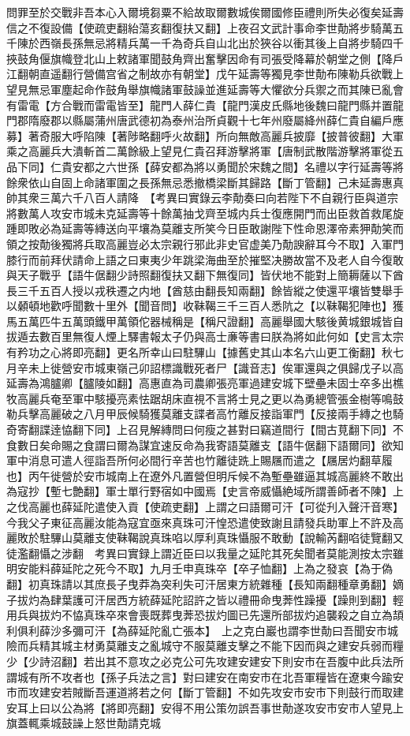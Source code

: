 問罪至於交戰非吾本心入爾境芻粟不給故取爾數城俟爾國修臣禮則所失必復矣延壽信之不復設備【使疏吏翻紿蕩亥翻復扶又翻】上夜召文武計事命李世勣將步騎萬五千陳於西嶺長孫無忌將精兵萬一千為奇兵自山北出於狹谷以衝其後上自將步騎四千挾鼓角偃旗幟登北山上敕諸軍聞鼓角齊出奮擊因命有司張受降幕於朝堂之側【降戶江翻朝直遥翻行營備宫省之制故亦有朝堂】戊午延壽等獨見李世勣布陳勒兵欲戰上望見無忌軍塵起命作鼓角舉旗幟諸軍鼓譟並進延壽等大懼欲分兵禦之而其陳已亂會有雷電【方合戰而雷電皆至】龍門人薛仁貴【龍門漢皮氏縣地後魏曰龍門縣并置龍門郡隋廢郡以縣屬蒲州唐武德初為泰州治所貞觀十七年州廢屬絳州薛仁貴自編戶應募】著奇服大呼陷陳【著陟略翻呼火故翻】所向無敵高麗兵披靡【披普彼翻】大軍乘之高麗兵大潰斬首二萬餘級上望見仁貴召拜游擊將軍【唐制武散階游擊將軍從五品下同】仁貴安都之六世孫【薛安都為將以勇聞於宋魏之間】名禮以字行延壽等將餘衆依山自固上命諸軍圍之長孫無忌悉撤橋梁斷其歸路【斷丁管翻】己未延壽惠真帥其衆三萬六千八百人請降　【考異曰實錄云李勣奏曰向若陛下不自親行臣與道宗將數萬人攻安市城未克延壽等十餘萬抽戈齊至城内兵士復應開門而出臣救首救尾旋踵即敗必為延壽等縳送向平壤為莫離支所笑今日臣敢謝陛下性命恩澤帝素狎勣笑而領之按勣後獨將兵取高麗豈必太宗親行邪此非史官虚美乃勣諛辭耳今不取】入軍門膝行而前拜伏請命上語之曰東夷少年跳梁海曲至於摧堅决勝故當不及老人自今復敢與天子戰乎【語牛倨翻少詩照翻復扶又翻下無復同】皆伏地不能對上簡耨薩以下酋長三千五百人授以戎秩遷之内地【酋慈由翻長知兩翻】餘皆縱之使還平壤皆雙舉手以顙頓地歡呼聞數十里外【聞音問】收靺鞨三千三百人悉阬之【以靺鞨犯陣也】獲馬五萬匹牛五萬頭鐵甲萬領佗器械稱是【稱尺證翻】高麗舉國大駭後黄城銀城皆自拔遁去數百里無復人煙上驛書報太子仍與高士亷等書曰朕為將如此何如【史言太宗有矜功之心將即亮翻】更名所幸山曰駐驆山【據舊史其山本名六山更工衡翻】秋七月辛未上徙營安市城東嶺己卯詔標識戰死者尸【識音志】俟軍還與之俱歸戊子以高延壽為鴻臚卿【臚陵如翻】高惠直為司農卿張亮軍過建安城下壁壘未固士卒多出樵牧高麗兵奄至軍中駭擾亮素怯踞胡床直視不言將士見之更以為勇總管張金樹等鳴鼓勒兵擊高麗破之八月甲辰候騎獲莫離支諜者高竹離反接詣軍門【反接兩手縳之也騎奇寄翻諜逹恊翻下同】上召見解縳問曰何瘦之甚對曰竊道間行【間古莧翻下同】不食數日矣命賜之食謂曰爾為謀宜速反命為我寄語莫離支【語牛倨翻下語爾同】欲知軍中消息可遣人徑詣吾所何必間行辛苦也竹離徒跣上賜屩而遣之【屩居灼翻草履也】丙午徙營於安市城南上在遼外凡置營但明斥候不為塹壘雖逼其城高麗終不敢出為寇抄【塹七艶翻】軍士單行野宿如中國焉【史言帝威懾絶域所謂善師者不陳】上之伐高麗也薛延陀遣使入貢【使疏吏翻】上謂之曰語爾可汗【可從刋入聲汗音寒】今我父子東征高麗汝能為寇宜亟來真珠可汗惶恐遣使致謝且請發兵助軍上不許及高麗敗於駐驆山莫離支使靺鞨說真珠啗以厚利真珠懾服不敢動【說輸芮翻啗徒覽翻又徒濫翻懾之涉翻　考異曰實録上謂近臣曰以我量之延陀其死矣聞者莫能測按太宗雖明安能料薛延陀之死今不取】九月壬申真珠卒【卒子恤翻】上為之發哀【為于偽翻】初真珠請以其庶長子曳莽為突利失可汗居東方統雜種【長知兩翻種章勇翻】嫡子拔灼為肆葉護可汗居西方統薛延陀詔許之皆以禮冊命曳莾性躁擾【躁則到翻】輕用兵與拔灼不恊真珠卒來會喪既葬曳莾恐拔灼圖已先還所部拔灼追襲殺之自立為頡利俱利薛沙多彌可汗【為薛延陀亂亡張本】　上之克白巖也謂李世勣曰吾聞安市城險而兵精其城主材勇莫離支之亂城守不服莫離支擊之不能下因而與之建安兵弱而糧少【少詩沼翻】若出其不意攻之必克公可先攻建安建安下則安市在吾腹中此兵法所謂城有所不攻者也【孫子兵法之言】對曰建安在南安市在北吾軍糧皆在遼東今踰安市而攻建安若賊斷吾運道將若之何【斷丁管翻】不如先攻安市安市下則鼓行而取建安耳上曰以公為將【將即亮翻】安得不用公策勿誤吾事世勣遂攻安市安市人望見上旗蓋輒乘城鼓譟上怒世勣請克城